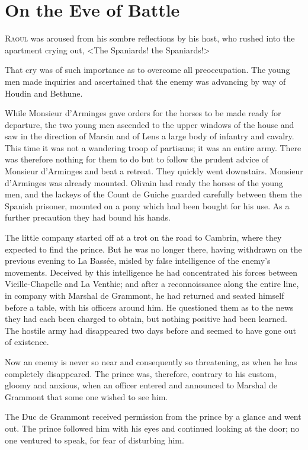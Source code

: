\chapter{On the Eve of Battle}

 \lettrine{R}{aoul} was aroused from his sombre reflections by his host, who rushed into the apartment crying out, <The Spaniards! the Spaniards!>

\zz
That cry was of such importance as to overcome all preoccupation. The young men made inquiries and ascertained that the enemy was advancing by way of Houdin and Bethune.

While Monsieur d'Arminges gave orders for the horses to be made ready for departure, the two young men ascended to the upper windows of the house and saw in the direction of Marsin and of Lens a large body of infantry and cavalry. This time it was not a wandering troop of partisans; it was an entire army. There was therefore nothing for them to do but to follow the prudent advice of Monsieur d'Arminges and beat a retreat. They quickly went downstairs. Monsieur d'Arminges was already mounted. Olivain had ready the horses of the young men, and the lackeys of the Count de Guiche guarded carefully between them the Spanish prisoner, mounted on a pony which had been bought for his use. As a further precaution they had bound his hands.

The little company started off at a trot on the road to Cambrin, where they expected to find the prince. But he was no longer there, having withdrawn on the previous evening to La Bassée, misled by false intelligence of the enemy's movements. Deceived by this intelligence he had concentrated his forces between Vieille-Chapelle and La Venthie; and after a reconnoissance along the entire line, in company with Marshal de Grammont, he had returned and seated himself before a table, with his officers around him. He questioned them as to the news they had each been charged to obtain, but nothing positive had been learned. The hostile army had disappeared two days before and seemed to have gone out of existence.

Now an enemy is never so near and consequently so threatening, as when he has completely disappeared. The prince was, therefore, contrary to his custom, gloomy and anxious, when an officer entered and announced to Marshal de Grammont that some one wished to see him.

The Duc de Grammont received permission from the prince by a glance and went out. The prince followed him with his eyes and continued looking at the door; no one ventured to speak, for fear of disturbing him.

